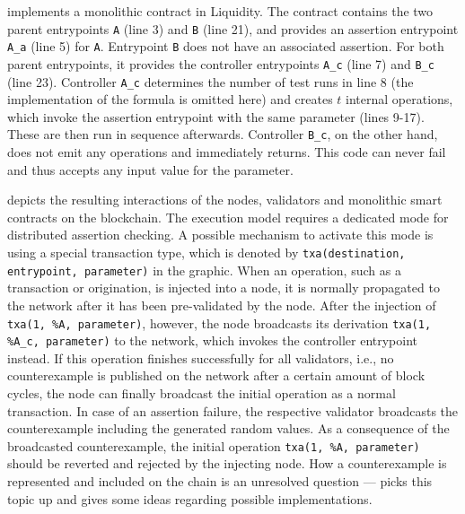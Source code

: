  implements a monolithic contract in Liquidity. The contract contains the two parent entrypoints \texttt{A} (line 3) and \texttt{B} (line 21), and provides an assertion entrypoint \texttt{A\_a} (line 5) for \texttt{A}. Entrypoint \texttt{B} does not have an associated assertion. For both parent entrypoints, it provides the controller entrypoints \texttt{A\_c} (line 7) and \texttt{B\_c} (line 23). Controller \texttt{A\_c} determines the number of test runs in line 8 (the implementation of the formula is omitted here) and creates $t$ internal operations, which invoke the assertion entrypoint with the same parameter (lines 9-17). These are then run in sequence afterwards. Controller \texttt{B\_c}, on the other hand, does not emit any operations and immediately returns. This code can never fail and thus accepts any input value for the parameter.


 depicts the resulting interactions of the nodes, validators and monolithic smart contracts on the blockchain. The execution model requires a dedicated mode for distributed assertion checking. A possible mechanism to activate this mode is using a special transaction type, which is denoted by \texttt{txa(destination, entrypoint, parameter)} in the graphic. When an operation, such as a transaction or origination, is injected into a node, it is normally propagated to the network after it has been pre-validated by the node. After the injection of \texttt{txa(1, \%A, parameter)}, however, the node broadcasts its derivation \texttt{txa(1, \%A\_c, parameter)} to the network, which invokes the controller entrypoint instead. If this operation finishes successfully for all validators, i.e., no counterexample is published on the network after a certain amount of block cycles, the node can finally broadcast the initial operation as a normal transaction. In case of an assertion failure, the respective validator broadcasts the counterexample including the generated random values. As a consequence of the broadcasted counterexample, the initial operation \texttt{txa(1, \%A, parameter)} should be reverted and rejected by the injecting node. How a counterexample is represented and included on the chain is an unresolved question ---  picks this topic up and gives some ideas regarding possible implementations. 

